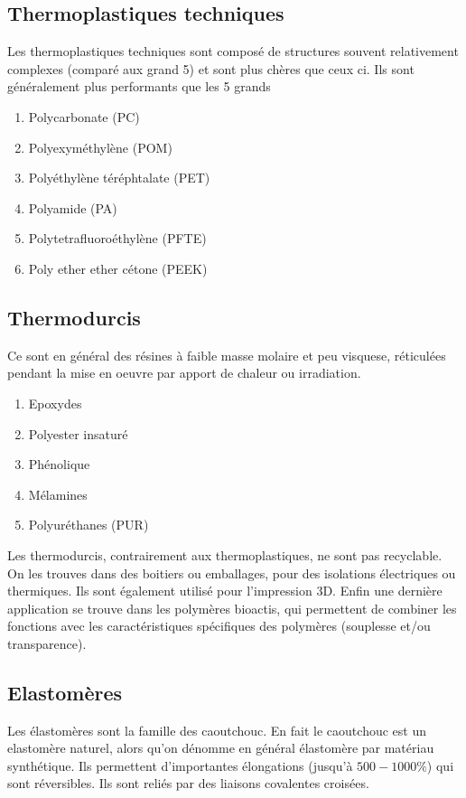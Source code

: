\documentclass[../main.tex]{subfiles}
\begin{document}
		\subsection{Thermoplastiques techniques}
		Les thermoplastiques techniques sont composé de structures souvent relativement complexes (comparé aux grand 5) et sont plus chères que ceux ci. Ils sont généralement plus performants que les 5 grands
		\begin{enumerate}
			\item Polycarbonate (PC)
			\item Polyexyméthylène (POM)
			\item Polyéthylène téréphtalate (PET)
			\item Polyamide (PA)
			\item Polytetrafluoroéthylène (PFTE)
			\item Poly ether ether cétone (PEEK)
		\end{enumerate}
		\subsection{Thermodurcis}
		Ce sont en général des résines à faible masse molaire et peu visquese, réticulées pendant la mise en oeuvre par apport de chaleur ou irradiation.
		\begin{enumerate}
			\item Epoxydes
			\item Polyester insaturé
			\item Phénolique
			\item Mélamines
			\item  Polyuréthanes (PUR)
		\end{enumerate}
		Les thermodurcis, contrairement aux thermoplastiques, ne sont pas recyclable. On les trouves dans des boitiers ou emballages, pour des isolations électriques ou thermiques. Ils sont également utilisé pour l'impression 3D. Enfin une dernière application se trouve dans les polymères bioactis, qui permettent de combiner les fonctions avec les caractéristiques spécifiques des polymères (souplesse et/ou transparence).
		\subsection{Elastomères}
		Les élastomères sont la famille des caoutchouc. En fait le caoutchouc est un elastomère naturel, alors qu'on dénomme en général élastomère par matériau synthétique. Ils permettent d'importantes élongations (jusqu'à $500-1000\%$) qui sont réversibles.
		Ils sont reliés par des liaisons covalentes croisées.
\end{document}
